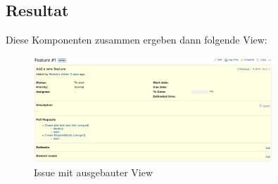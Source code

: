 \subsection{Resultat}
Diese Komponenten zusammen ergeben dann folgende View:
\begin{figure}[H]
  \centering
  \includegraphics[width=0.8\textwidth]{images/misc/issue_details.png}
  \caption[Screenshot eines Issues mit ausgebauter View]{Issue mit ausgebauter View}
  \label{fig:issue_details}
\end{figure}
